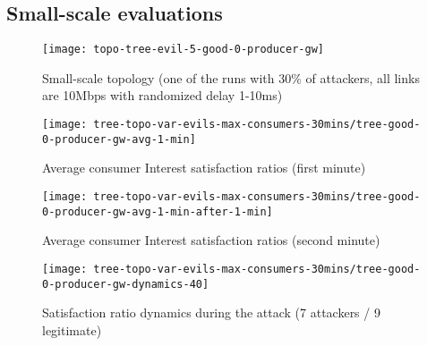 \subsection{Small-scale evaluations}
\label{sec:small-scale}

\begin{figure}[htbp]
  \centering
  \texttt{[image: topo-tree-evil-5-good-0-producer-gw]}
  \caption{Small-scale topology (one of the runs with 30\% of attackers, all links are 10Mbps with randomized delay 1-10ms)}
  \label{fig:small-scale-topo}
\end{figure}


\begin{figure}[htbp]
  \centering
  \texttt{[image: tree-topo-var-evils-max-consumers-30mins/tree-good-0-producer-gw-avg-1-min]}
  \caption{Average consumer Interest satisfaction ratios (first minute)}
  \label{fig:small-scale-topo 1}
\end{figure}


\begin{figure}[htbp]
  \centering
  \texttt{[image: tree-topo-var-evils-max-consumers-30mins/tree-good-0-producer-gw-avg-1-min-after-1-min]}
  \caption{Average consumer Interest satisfaction ratios (second minute)}
  \label{fig:small-scale-topo 2}
\end{figure}

\begin{figure}[htbp]
  \centering
  \texttt{[image: tree-topo-var-evils-max-consumers-30mins/tree-good-0-producer-gw-dynamics-40]}
  \caption{Satisfaction ratio dynamics during the attack (7 attackers / 9 legitimate)}
  \label{fig:small-scale-topo 3}
\end{figure}


